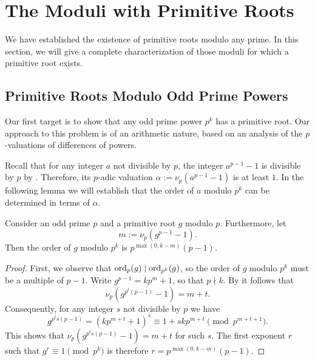 \chapter{The Moduli with Primitive Roots}

We have established the existence of primitive roots modulo any prime. In this section, we will give a complete characterization of those moduli for which a primitive root exists.

\section{Primitive Roots Modulo Odd Prime Powers}
Our first target is to show that any odd prime power $p^k$ has a primitive root. Our approach to this problem is of an arithmetic nature, based on an analysis of the $p$-valuations of differences of powers.

Recall that for any integer $a$ not divisible by $p$, the integer $a^{p-1}-1$ is divisible by $p$ by . Therefore, its $p$-adic valuation $\alpha:=\nu_p(a^{p-1}-1)$ is at least $1$. In the following lemma we will establish that the order of $a$ modulo $p^k$ can be determined in terms of $\alpha$.

\begin{lemma}\label{lemma:order-modulo-prime-power-primitive-root}
  Consider an odd prime $p$ and a primitive root $g$ modulo $p$. Furthermore, let
  \begin{equation*}
    m:=\nu_p(g^{p-1}-1).
  \end{equation*}
  Then the order of $g$ modulo $p^k$ is $p^{\max(0,k-m)}(p-1)$. 
\end{lemma}

\begin{proof}
  First, we observe that $\operatorname{ord}_p(g)\mid \operatorname{ord}_{p^k}(g)$, so the order of $g$ modulo $p^k$ must be a multiple of $p-1$. Write $g^{p-1}=kp^{m}+1$, so that $p\nmid k$. By  it follows that
  \begin{equation*}
    \nu_p(g^{p^t(p-1)}-1)=m+t.
  \end{equation*}
  Consequently, for any integer $s$ not divisible by $p$ we have
  \begin{equation*}
    g^{p^ts(p-1)}=(kp^{m+t}+1)^s\equiv 1+skp^{m+t}\pmod{p^{m+t+1}}.
  \end{equation*}
  This shows that $\nu_p(g^{p^ts(p-1)}-1)=m+t$ for such $s$. The first exponent $r$ such that $g^r\equiv 1\pmod{p^k}$ is therefore $r=p^{\max(0,k-m)}(p-1)$.
\end{proof}

